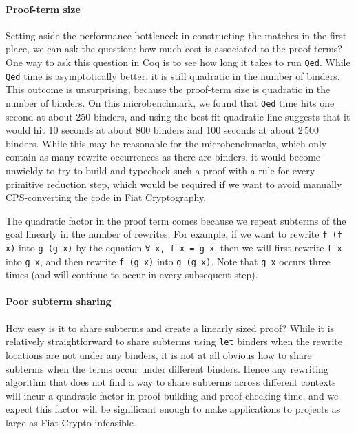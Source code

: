 \paragraph{Proof-term size}

Setting aside the performance bottleneck in constructing the matches in the first place, we can ask the question: how much cost is associated to the proof terms?
One way to ask this question in Coq is to see how long it takes to run \texttt{Qed}.
While \texttt{Qed} time is asymptotically better, it is still quadratic in the number of binders.
This outcome is unsurprising, because the proof-term size is quadratic in the number of binders.
On this microbenchmark, we found that \texttt{Qed} time hits one second at about 250 binders, and using the best-fit quadratic line suggests that it would hit 10 seconds at about 800 binders and 100 seconds at about 2\,500 binders.
While this may be reasonable for the microbenchmarks, which only contain as many rewrite occurrences as there are binders, it would become unwieldy to try to build and typecheck such a proof with a rule for every primitive reduction step, which would be required if we want to avoid manually CPS-converting the code in Fiat Cryptography.

The quadratic factor in the proof term comes because we repeat subterms of the goal linearly in the number of rewrites.
For example, if we want to rewrite \texttt{f (f x)} into \texttt{g (g x)} by the equation \texttt{∀ x, f x = g x}, then we will first rewrite \texttt{f x} into \texttt{g x}, and then rewrite \texttt{f (g x)} into \texttt{g (g x)}.
Note that \texttt{g x} occurs three times (and will continue to occur in every subsequent step).

\paragraph{Poor subterm sharing}

How easy is it to share subterms and create a linearly sized proof?
While it is relatively straightforward to share subterms using \texttt{let} binders when the rewrite locations are not under any binders, it is not at all obvious how to share subterms when the terms occur under different binders.
Hence any rewriting algorithm that does not find a way to share subterms across different contexts will incur a quadratic factor in proof-building and proof-checking time, and we expect this factor will be significant enough to make applications to projects as large as Fiat Crypto infeasible.

